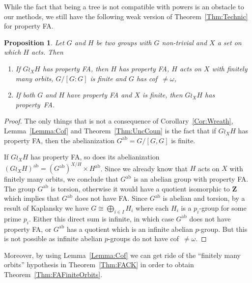 \documentclass[a4paper]{article}
\newtheorem{prop}[lem]{Proposition}
\theoremstyle{definition}
\DeclareMathOperator\ab{ab}
\newcommand*{\field}[1]{\mathbf{#1}}
\newcommand*{\Z}{\field{Z}}
\begin{document}
%
%
While the fact that being a tree is not compatible with powers is an obstacle to our methods, we still have the following weak version of Theorem~\ref{Thm:Technic} for property FA.
%
%
\begin{prop}\label{Prop:WRFA}
Let $G$ and $H$ be two groups with $G$ non-trivial and $X$ a set on which $H$ acts.
Then
\begin{enumerate}
\item If $G\wr_XH$ has property FA, then $H$ has property FA, $H$ acts on $X$ with finitely many orbits, $G/[G:G]$ is finite and $G$ has cof~$\neq\omega$,
\item If both $G$ and $H$ have property FA and $X$ is finite, then $G\wr_XH$ has property~FA.
\end{enumerate}
\end{prop}
\begin{proof}
The only things that is not a consequence of Corollary~\ref{Cor:Wreath}, Lemma~\ref{Lemma:Cof} and Theorem~\ref{Thm:UncCoun} is the fact that if $G\wr_XH$ has property FA, then the abelianization $G^{\ab}=G/[G,G]$ is finite.

If $G\wr_XH$ has property FA, so does its abelianization $(G\wr_XH)^{\ab}=(G^{\ab})^{X/H}\times H^{\ab}$. Since we already know that $H$ acts on $X$ with finitely many orbits, we conclude that $G^{\ab}$ is an abelian group with property FA. %
The group $G^{\ab}$ is torsion, otherwise it would have a quotient isomorphic to $\Z$ which implies that $G^{\ab}$ does not have FA.
Since $G^{\ab}$ is abelian and torsion, by a result of Kaplansky we have $G\cong\bigoplus_{i\in I}H_i$ where each $H_i$ is a $p_i$-group for some prime $p_i$.
Either this direct sum is infinite, in which case $G^{\ab}$ does not have property FA, or $G^{\ab}$ has a quotient which is an infinite abelian $p$-group. But this is not possible as infinite abelian $p$-groups do not have cof~$\neq\omega$.
\end{proof}
%
%
Moreover, by using Lemma~\ref{Lemma:Cof} we can get ride of the ``finitely many orbits'' hypothesis in Theorem~\ref{Thm:FACK} in order to obtain Theorem~\ref{Thm:FAFiniteOrbits}.
%
%
%
%
%
%
%
%
%
%
%
%
\end{document}
